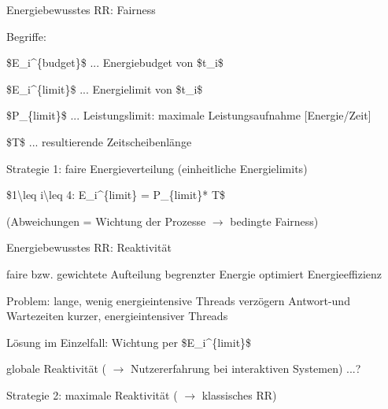 \documentclass[a4paper]{article}
\begin{document}
\begin{multicols}{3}
    Energiebewusstes RR: Fairness

    \begin{itemize*}
        \item
        Begriffe:
        \begin{itemize*}
            \item \$E\_i\^{}\{budget\}\$ ... Energiebudget von \$t\_i\$
            \item \$E\_i\^{}\{limit\}\$ ... Energielimit von \$t\_i\$
            \item \$P\_\{limit\}\$ ... Leistungslimit: maximale Leistungsaufnahme {[}Energie/Zeit{]}
            \item \$T\$ ... resultierende Zeitscheibenlänge
        \end{itemize*}
        \item
        Strategie 1: faire Energieverteilung (einheitliche Energielimits)
        \begin{itemize*}
            \item \$1\textbackslash leq i\textbackslash leq 4: E\_i\^{}\{limit\} = P\_\{limit\}* T\$
            \item (Abweichungen = Wichtung der Prozesse $\rightarrow$ bedingte Fairness)
        \end{itemize*}
    \end{itemize*}

    Energiebewusstes RR: Reaktivität

    \begin{itemize*}
        \item
        faire bzw. gewichtete Aufteilung begrenzter Energie optimiert
        Energieeffizienz
        \item
        Problem: lange, wenig energieintensive Threads verzögern Antwort-und
        Wartezeiten kurzer, energieintensiver Threads
        \begin{itemize*}
            \item Lösung im Einzelfall: Wichtung per \$E\_i\^{}\{limit\}\$
            \item globale Reaktivität ( $\rightarrow$ Nutzererfahrung bei interaktiven Systemen) ...?
        \end{itemize*}
        \item
        Strategie 2: maximale Reaktivität ( $\rightarrow$
        klassisches RR)
    \end{itemize*}


\end{multicols}
\end{document}
